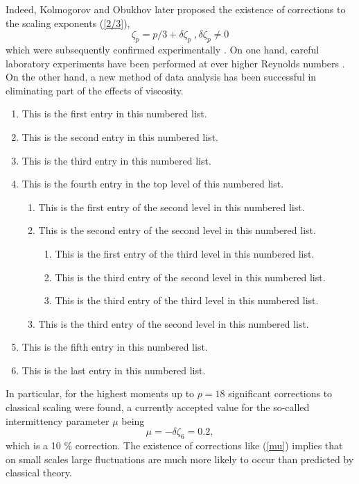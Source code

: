 \documentclass[dc]{svjour}
\begin{document}
Indeed, Kolmogorov \cite{kolmogorov62} and Obukhov \cite{obukhov62}
later proposed the existence of
corrections to the scaling exponents (\ref{2/3}),
\begin{equation}
  \label{correct}
     \zeta_p = p/3 + \delta\zeta_p \;, \delta\zeta_p \ne 0
\end{equation}
which were subsequently confirmed experimentally
\cite{anselmet84,benzi93a,benzi93b,herweijer95}.
On one hand, careful laboratory
experiments have been performed at ever higher Reynolds numbers
\cite{anselmet84,castaing90}. On the other hand, a new method of
data analysis \cite{benzi93a,benzi93b} has been successful
in eliminating part of the effects of viscosity.
\begin{enumerate}
\item This is the first entry in this numbered list.
\item This is the second entry in this numbered list.
\item This is the third entry in this numbered list.
\item This is the fourth entry in the top level of this numbered list.
\begin{enumerate}
\item This is the first entry of the second level in this numbered list.
\item This is the second entry of the second level in this numbered list.
\begin{enumerate}
\item This is the first entry of the third level in this numbered list.
\item This is the third entry of the second level in this numbered list.
\item This is the third entry of the third level in this numbered list.
\end{enumerate}
\item This is the third entry of the second level in this numbered list.
\end{enumerate}
\item This is the fifth entry in this numbered list.
\item This is the last entry in this numbered list.
\end{enumerate}
In particular,
for the highest moments up to $p = 18$ significant corrections to
classical scaling were found, a currently accepted value for the so-called
intermittency parameter $\mu$ being
\cite{anselmet84}
\begin{equation}
  \label{mu}
     \mu = -\delta\zeta_6 = 0.2 ,
\end{equation}
which is a 10 \% correction. The existence of corrections like
(\ref{mu}) implies that on small scales large fluctuations are much more
likely to occur than predicted by classical theory.
\end{document}

